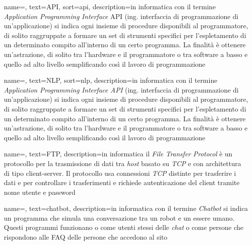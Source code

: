 
\renewcommand{\acronymname}{Acronimi e abbreviazioni}

{
    name=,
    text=API,
    sort=api,
    description={in informatica con il termine \emph{Application Programming
Interface} API (ing. interfaccia di programmazione di un’applicazione) si
indica ogni insieme di procedure disponibili al programmatore, di solito raggruppate
a formare un set di strumenti specifici per l’espletamento di un determinato
compito all’interno di un certo programma. La finalità è ottenere un’astrazione,
di solito tra l’hardware e il programmatore o tra software a basso e quello ad alto
livello semplificando così il lavoro di programmazione}
}

{
    name=,
    text=NLP,
    sort=nlp,
    description={in informatica con il termine \emph{Application Programming Interface API} (ing. interfaccia di programmazione di un'applicazione) si indica ogni insieme di procedure disponibili al programmatore, di solito raggruppate a formare un set di strumenti specifici per l'espletamento di un determinato compito all'interno di un certo programma. La finalità è ottenere un'astrazione, di solito tra l'hardware e il programmatore o tra software a basso e quello ad alto livello semplificando così il lavoro di programmazione}
}

{
    name=,
    text=FTP,
    description={in informatica il \emph{File Transfer Protocol} è un protocollo per la trasmissione di dati tra \emph{host} basato su \emph{TCP} e con architettura di tipo client-server. Il protocollo usa connessioni \emph{TCP} distinte per trasferire i dati e per controllare i trasferimenti e richiede autenticazione del client tramite nome utente e password}
}

{
    name=,
    text=chatbot,
    description={in informatica con il termine \emph{Chatbot} si indica un programma che simula una conversazione tra un robot e un essere umano. Questi programmi funzionano o come utenti stessi delle \emph{chat} o come persone che rispondono alle FAQ delle persone che accedono al sito}
}


